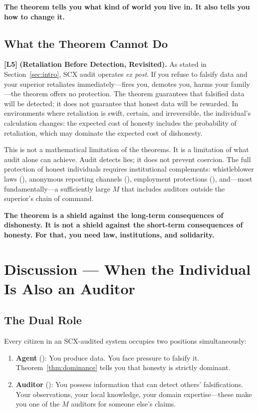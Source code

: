 \documentclass[11pt,a4paper]{article}
\theoremstyle{definition}
\theoremstyle{remark}
\newcommand{\limitationTag}[1]{\textsf{\textbf{[L#1]}}}
\newcommand{\SCX}{\textsc{SCX}}
\begin{document}
\textbf{The theorem tells you what kind of world you live in. It also tells you how to change it.}

\subsection{What the Theorem Cannot Do }

\limitationTag{5} \textbf{(Retaliation Before Detection, Revisited).} As stated in Section~\ref{sec:intro}, \SCX{} audit operates \emph{ex post}. If you refuse to falsify data and your superior retaliates immediately---fires you, demotes you, harms your family---the theorem offers no protection. The theorem guarantees that falsified data will be detected; it does not guarantee that honest data will be rewarded. In environments where retaliation is swift, certain, and irreversible, the individual's calculation changes: the expected cost of honesty includes the probability of retaliation, which may dominate the expected cost of dishonesty.

This is not a mathematical limitation of the theorems. It is a limitation of what audit alone can achieve. Audit detects lies; it does not prevent coercion. The full protection of honest individuals requires institutional complements: whistleblower laws (), anonymous reporting channels (), employment protections (), and---most fundamentally---a sufficiently large $M$ that includes auditors outside the superior's chain of command.

\textbf{The theorem is a shield against the long-term consequences of dishonesty. It is not a shield against the short-term consequences of honesty. For that, you need law, institutions, and solidarity.}

\section{Discussion --- When the Individual Is Also an Auditor }
\label{sec:discussion}

\subsection{The Dual Role }

Every citizen in an \SCX{}-audited system occupies two positions simultaneously:

\begin{enumerate}[label=(\roman*)]
    \item \textbf{Agent} (): You produce data. You face pressure to falsify it. Theorem~\ref{thm:dominance} tells you that honesty is strictly dominant.
    \item \textbf{Auditor} (): You possess information that can detect others' falsifications. Your observations, your local knowledge, your domain expertise---these make you one of the $M$ auditors for someone else's claims.
\end{enumerate}
\end{document}
